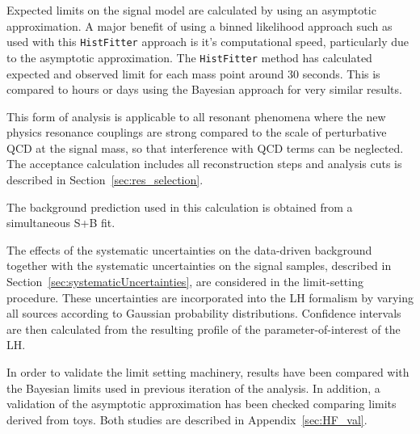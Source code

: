 Expected limits on the signal model are calculated by using an asymptotic approximation. A major benefit
of using a binned likelihood approach such as used with this \texttt{HistFitter} approach is it's
computational speed, particularly due to the asymptotic approximation.
The \texttt{HistFitter} method has calculated expected and observed limit for each mass point around 30 seconds.
This is compared to hours or days using the Bayesian approach for very similar results.
%
%
%

This form of analysis is applicable to all resonant phenomena
where the new physics resonance couplings are strong compared to the scale of perturbative QCD
at the signal mass, so that interference with QCD terms can be neglected.
The acceptance calculation includes all reconstruction steps and analysis cuts is
described in Section~\ref{sec:res_selection}.

The background prediction used in this calculation is obtained from a
simultaneous S+B fit.

The effects of the systematic uncertainties on the data-driven background together with the systematic uncertainties
on the signal samples, described in Section~\ref{sec:systematicUncertainties}, are considered in the limit-setting procedure.
These uncertainties are incorporated into the LH formalism by varying all sources according
to Gaussian probability distributions.
Confidence intervals are then calculated from the resulting profile of
the parameter-of-interest of the LH.

In order to validate the limit setting machinery, results have been compared
with
the Bayesian limits used in previous iteration of the analysis. In addition, a
validation of the asymptotic approximation has been checked comparing limits
derived from toys. Both studies are described in Appendix~\ref{sec:HF_val}.
